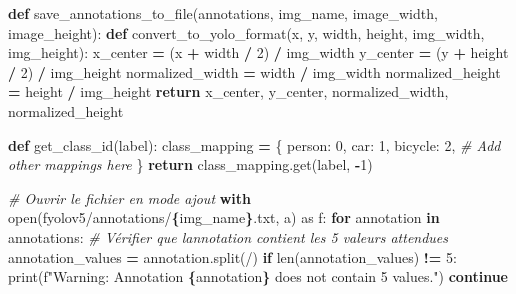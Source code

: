 \documentclass[
  10pt,
]{article}
\newenvironment{Shaded}{\begin{snugshade}}{\end{snugshade}}
\newcommand{\BuiltInTok}[1]{#1}
\newcommand{\CommentTok}[1]{\textcolor[rgb]{0.56,0.35,0.01}{\textit{#1}}}
\newcommand{\ControlFlowTok}[1]{\textcolor[rgb]{0.13,0.29,0.53}{\textbf{#1}}}
\newcommand{\DecValTok}[1]{\textcolor[rgb]{0.00,0.00,0.81}{#1}}
\newcommand{\ImportTok}[1]{#1}
\newcommand{\KeywordTok}[1]{\textcolor[rgb]{0.13,0.29,0.53}{\textbf{#1}}}
\newcommand{\NormalTok}[1]{#1}
\newcommand{\OperatorTok}[1]{\textcolor[rgb]{0.81,0.36,0.00}{\textbf{#1}}}
\newcommand{\SpecialCharTok}[1]{\textcolor[rgb]{0.81,0.36,0.00}{\textbf{#1}}}
\newcommand{\SpecialStringTok}[1]{\textcolor[rgb]{0.31,0.60,0.02}{#1}}
\newcommand{\StringTok}[1]{\textcolor[rgb]{0.31,0.60,0.02}{#1}}
\begin{document}
\begin{Shaded}
\begin{Highlighting}[]
\KeywordTok{def}\NormalTok{ save\_annotations\_to\_file(annotations, img\_name, image\_width, image\_height):}
    \KeywordTok{def}\NormalTok{ convert\_to\_yolo\_format(x, y, width, height, img\_width, img\_height):}
\NormalTok{        x\_center }\OperatorTok{=}\NormalTok{ (x }\OperatorTok{+}\NormalTok{ width }\OperatorTok{/} \DecValTok{2}\NormalTok{) }\OperatorTok{/}\NormalTok{ img\_width}
\NormalTok{        y\_center }\OperatorTok{=}\NormalTok{ (y }\OperatorTok{+}\NormalTok{ height }\OperatorTok{/} \DecValTok{2}\NormalTok{) }\OperatorTok{/}\NormalTok{ img\_height}
\NormalTok{        normalized\_width }\OperatorTok{=}\NormalTok{ width }\OperatorTok{/}\NormalTok{ img\_width}
\NormalTok{        normalized\_height }\OperatorTok{=}\NormalTok{ height }\OperatorTok{/}\NormalTok{ img\_height}
        \ControlFlowTok{return}\NormalTok{ x\_center, y\_center, normalized\_width, normalized\_height}

    \KeywordTok{def}\NormalTok{ get\_class\_id(label):}
\NormalTok{        class\_mapping }\OperatorTok{=}\NormalTok{ \{}
            \StringTok{\textquotesingle{}person\textquotesingle{}}\NormalTok{: }\DecValTok{0}\NormalTok{,}
            \StringTok{\textquotesingle{}car\textquotesingle{}}\NormalTok{: }\DecValTok{1}\NormalTok{,}
            \StringTok{\textquotesingle{}bicycle\textquotesingle{}}\NormalTok{: }\DecValTok{2}\NormalTok{,}
            \CommentTok{\# Add other mappings here}
\NormalTok{        \}}
        \ControlFlowTok{return}\NormalTok{ class\_mapping.get(label, }\OperatorTok{{-}}\DecValTok{1}\NormalTok{)}

    \CommentTok{\# Ouvrir le fichier en mode ajout}
    \ControlFlowTok{with} \BuiltInTok{open}\NormalTok{(}\SpecialStringTok{f\textquotesingle{}yolov5/annotations/}\SpecialCharTok{\{}\NormalTok{img\_name}\SpecialCharTok{\}}\SpecialStringTok{.txt\textquotesingle{}}\NormalTok{, }\StringTok{\textquotesingle{}a\textquotesingle{}}\NormalTok{) }\ImportTok{as}\NormalTok{ f:}
        \ControlFlowTok{for}\NormalTok{ annotation }\KeywordTok{in}\NormalTok{ annotations:}
            \CommentTok{\# Vérifier que l\textquotesingle{}annotation contient les 5 valeurs attendues}
\NormalTok{            annotation\_values }\OperatorTok{=}\NormalTok{ annotation.split(}\StringTok{\textquotesingle{}/\textquotesingle{}}\NormalTok{)}
            \ControlFlowTok{if} \BuiltInTok{len}\NormalTok{(annotation\_values) }\OperatorTok{!=} \DecValTok{5}\NormalTok{:}
                \BuiltInTok{print}\NormalTok{(}\SpecialStringTok{f"Warning: Annotation \textquotesingle{}}\SpecialCharTok{\{}\NormalTok{annotation}\SpecialCharTok{\}}\SpecialStringTok{\textquotesingle{} does not contain 5 values."}\NormalTok{)}
                \ControlFlowTok{continue}


\end{Highlighting}
\end{Shaded}
\end{document}
